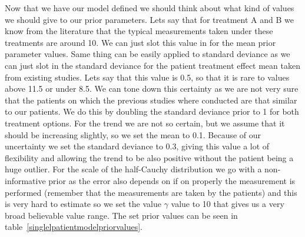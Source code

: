 \documentclass[12pt,a4paper,leqno]{report}
\theoremstyle{plain}
\theoremstyle{definition}
\theoremstyle{remark}
\begin{document}
\bigskip
{}
\bigskip


Now that we have our model defined we should think about what kind of values we should
give to our prior parameters. Lets say that for treatment A and B we know from the
literature that the typical measurements taken under these treatments are around 10. We
can just slot this value in for the mean prior parameter values. Same thing can be
easily applied to standard deviance as we can just slot in the standard deviance for the
patient treatment effect mean taken from existing studies. Lets say that this value is
0.5, so that it is rare to values above 11.5 or under 8.5. We can tone down this certainty
as we are not very sure that the patients on which the previous studies where conducted
are that similar to our patients. We do this by doubling the standard deviance prior to 1 for both
treatment options. For the trend we are not so certain, but we assume that it should be
increasing slightly, so we set the mean to 0.1. Because of our uncertainty we set the
standard deviance to 0.3, giving this value a lot of flexibility and allowing the trend to be also
positive without the patient being a huge outlier. For the scale of the half-Cauchy
distribution we go with a non-informative prior as the error also depends on if on
properly the measurement is performed (remember that the measurements are taken by the
patients) and this is very hard to estimate so we set the value \(\gamma \) value to 10
that gives us a very broad believable value range. The set prior values can be seen
in table\ \ref{singlelpatientmodelpriorvalues}.
\end{document}
